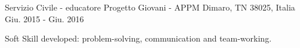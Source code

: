\begin{cventries}
  \cventry
    {Servizio Civile - educatore} %
    {Progetto Giovani - APPM} %
    {Dimaro, TN 38025, Italia} %
    {Giu. 2015 - Giu. 2016} %
    {
      \begin{cvitems} %
        \item {Soft Skill developed: problem-solving, communication and team-working.}
      \end{cvitems}
    }

\end{cventries}

